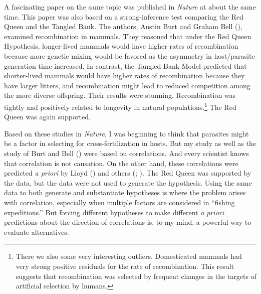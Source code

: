 \documentclass[
  letterpaper,
]{book}
\begin{document}
A fascinating paper on the same topic was published in \emph{Nature} at
about the same time. This paper was also based on a strong-inference
test comparing the Red Queen and the Tangled Bank. The authors, Austin
Burt and Graham Bell (), examined
recombination in mammals. They reasoned that under the Red Queen
Hypothesis, longer-lived mammals would have higher rates of
recombination because more genetic mixing would be favored as the
asymmetry in host/parasite generation time increased. In contrast, the
Tangled Bank Model predicted that shorter-lived mammals would have
higher rates of recombination because they have larger litters, and
recombination might lead to reduced competition among the more diverse
offspring. Their results were stunning. Recombination was tightly and
positively related to longevity in natural populations.\footnote{There
  we also some very interesting outliers. Domesticated mammals had very
  strong positive residuals for the rate of recombination. This result
  suggests that recombination was selected by frequent changes in the
  targets of artificial selection by humans.} The Red Queen was again
supported.

Based on these studies in \emph{Nature}, I was beginning to think that
parasites might be a factor in selecting for cross-fertilization in
hosts. But my study as well as the study of Burt and Bell
() were based on correlations. And every
scientist knows that correlation is not causation. On the other hand,
these correlations were predicted \emph{a priori} by Lloyd
() and others
(;
). The Red Queen
was supported by the data, but the data were not used to generate the
hypothesis. Using the same data to both generate and substantiate
hypotheses is where the problem arises with correlation, especially when
multiple factors are considered in ``fishing expeditions.'' But forcing
different hypotheses to make different \emph{a priori} predictions about
the direction of correlations is, to my mind, a powerful way to evaluate
alternatives.
\end{document}
